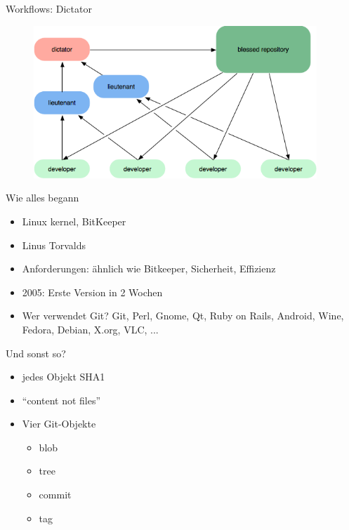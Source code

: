 \documentclass{beamer}
\begin{document}
\begin{frame}{Workflows: Dictator}
 
  \begin{figure}
     \includegraphics[width=0.95\textwidth]{./images/workflow-dictator.png}
  \end{figure}

\end{frame}


\begin{frame}[<+->]{Wie alles begann}{}

  \begin{itemize}
    \item Linux kernel, BitKeeper
    \item Linus Torvalds
    \item Anforderungen: ähnlich wie Bitkeeper, Sicherheit, Effizienz
    \item 2005: Erste Version in 2 Wochen
    \item Wer verwendet Git? Git, Perl, Gnome, Qt, Ruby on Rails, Android, Wine, Fedora, Debian, X.org, VLC, ...
  \end{itemize}

\end{frame}

\begin{frame}[<+->]{Und sonst so?}{}

  \begin{itemize}
    \item jedes Objekt SHA1
    \item ``content not files''
    \item Vier Git-Objekte
    \begin{itemize}
     \item blob
     \item tree
     \item commit
     \item tag
    \end{itemize}
  \end{itemize}

\end{frame}
\end{document}
